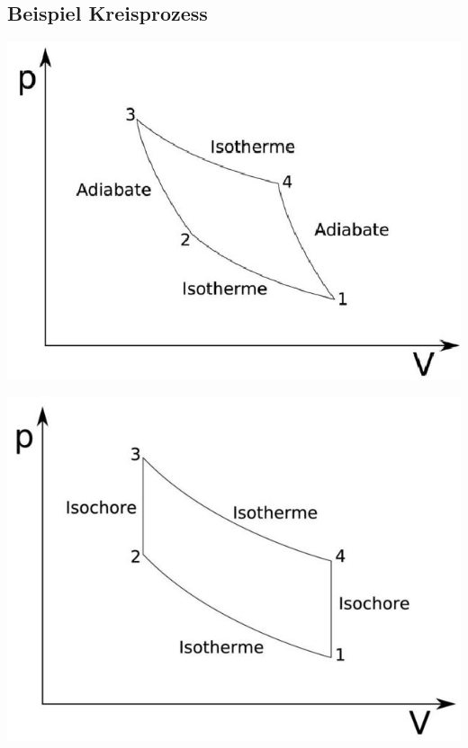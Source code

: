 \subsection{Beispiel Kreisprozess}
\begin{minipage}{0.48\linewidth}
\includegraphics[width=\linewidth]{Bilder/kreisprozess_2} \\
\end{minipage}
\hfill
\begin{minipage}{0.48\linewidth}
\includegraphics[width=\linewidth]{Bilder/kreisprozess_3} \\
\end{minipage}



